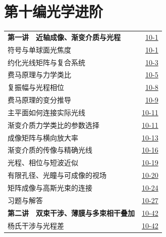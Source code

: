 \section*{第十编\quad 光学进阶}
\begin{longtable}{@{}p{}r@{}}
\textbf{第一讲　近轴成像、渐变介质与光程}&\href{course-page:10:5}{10-1}\\[2pt]
\hspace{1em}符号与单球面光焦度&\href{course-page:10:5}{10-1}\\[2pt]
\hspace{1em}约化光线矩阵与复合系统&\href{course-page:10:7}{10-3}\\[2pt]
\hspace{1em}费马原理与力学类比&\href{course-page:10:9}{10-5}\\[2pt]
\hspace{1em}复振幅与光程相位&\href{course-page:10:12}{10-8}\\[2pt]
\hspace{1em}费马原理的变分推导&\href{course-page:10:13}{10-9}\\[2pt]
\hspace{1em}主平面如何连接实际光线&\href{course-page:10:15}{10-11}\\[2pt]
\hspace{1em}渐变介质力学类比的参数选择&\href{course-page:10:15}{10-11}\\[2pt]
\hspace{1em}成像矩阵与横向放大率&\href{course-page:10:17}{10-13}\\[2pt]
\hspace{1em}渐变介质的传像与精确光线&\href{course-page:10:20}{10-16}\\[2pt]
\hspace{1em}光程、相位与短波近似&\href{course-page:10:23}{10-19}\\[2pt]
\hspace{1em}有限孔径、光瞳与可成像的视场&\href{course-page:10:24}{10-20}\\[2pt]
\hspace{1em}矩阵成像与高斯光束的连接&\href{course-page:10:28}{10-24}\\[2pt]
\hspace{1em}习题与解答&\href{course-page:10:31}{10-27}\\[2pt]
\textbf{第二讲　双束干涉、薄膜与多束相干叠加}&\href{course-page:10:46}{10-42}\\[2pt]
\hspace{1em}杨氏干涉与光程差&\href{course-page:10:46}{10-42}\\[2pt]

\end{longtable}

